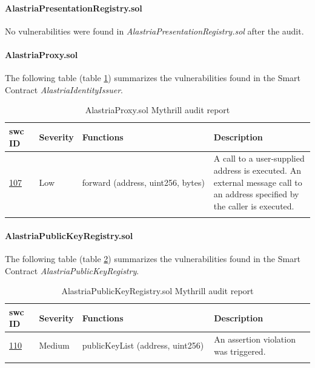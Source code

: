 \paragraph{AlastriaPresentationRegistry.sol}
No vulnerabilities were found in \textit{AlastriaPresentationRegistry.sol} after the audit.

\paragraph{AlastriaProxy.sol}
The following table (table \ref{tab:AlastriaProxy}) summarizes the vulnerabilities found in the Smart Contract \textit{AlastriaIdentityIssuer}.\newline
\begin{longtable}{||p{0.1\linewidth} | p{0.11\linewidth} | p{0.45\linewidth} | p{0.35\linewidth}||}
    \hline
    \textbf{\acrshort{swc} ID}                      & \textbf{Severity} & \textbf{Functions}                & \textbf{Description}                                                                                                       \\ [0.5ex]
    \hline\hline
    \href{https://swcregistry.io/docs/SWC-107}{107} & Low               & forward (address, uint256, bytes) & A call to a user-supplied address is executed. An external message call to an address specified by the caller is executed. \\ [1ex]
    \hline
    \caption{AlastriaProxy.sol Mythrill audit report}
    \label{tab:AlastriaProxy}
\end{longtable}

\paragraph{AlastriaPublicKeyRegistry.sol}
The following table (table \ref{tab:AlastriaPublicKeyRegistry}) summarizes the vulnerabilities found in the Smart Contract \textit{AlastriaPublicKeyRegistry}.
\begin{longtable}{||p{0.1\linewidth} | p{0.11\linewidth} | p{0.45\linewidth} | p{0.35\linewidth}||}
    \hline
    \textbf{\acrshort{swc} ID}                      & \textbf{Severity} & \textbf{Functions}               & \textbf{Description}                  \\ [0.5ex]
    \hline\hline
    \href{https://swcregistry.io/docs/SWC-110}{110} & Medium            & publicKeyList (address, uint256) & An assertion violation was triggered. \\ [1ex]
    \hline
    \caption{AlastriaPublicKeyRegistry.sol Mythrill audit report}
    \label{tab:AlastriaPublicKeyRegistry}
\end{longtable}

